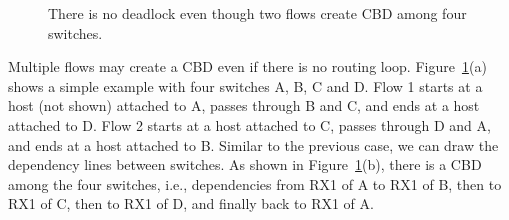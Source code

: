 \begin{figure}[t]
	\vspace{-0.15in}
	\caption{There is no deadlock even though two flows create CBD among four switches.}
	\label{fig:case1}
	\vspace{-0.2in}
\end{figure}


Multiple flows may create a CBD even if there is no routing loop.
Figure~\ref{fig:case1}(a) shows a simple example with four switches A, B, C and D.
Flow 1 starts at a host (not shown) attached to A, passes through B and C, and ends at a
host attached to D. Flow 2 starts at a host attached to C, passes through D and A, and
ends at a host attached to B.
Similar to the previous case, we can draw the dependency lines between switches. As shown in
Figure~\ref{fig:case1}(b), there is a CBD among the four switches, i.e.,
dependencies from RX1 of A to RX1 of B, then to RX1 of C, then to RX1 of D, and finally back to RX1 of A.


